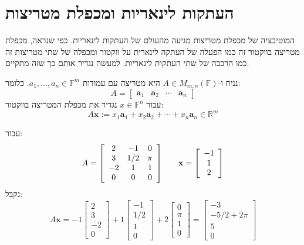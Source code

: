 \documentclass{tstextbook}
\begin{document}
\section{העתקות לינאריות ומכפלת מטריצות}

המוטיבציה של מכפלת מטריצות מגיעה מהעולם של העתקות לינאריות. כפי שנראה, מכפלת מטריצה בווקטור זה כמו הפעלה של העתקה לינארית על ווקטור ומכפלה של שתי מטריצות זה כמו הרכבה של שתי העתקות לינאריות. למעשה נגדיר אותם כך שזה מתקיים.

\begin{definition}
נניח ו-\(A\in M_{m,n}\left( \mathbb{F} \right)\) היא מטריצה עם עמודות \(a_{1},\dots,a_{n}\in \mathbb{F} ^{m}\). כלומר:
$$A=\begin{bmatrix}\mathbf{a}_{1}&\mathbf{a}_{2}&\cdots&\mathbf{a}_{n}\end{bmatrix}$$
עבור \(x \in \mathbb{F} ^{n}\) נגדיר את מכפלת המטריצה בווקטור:
$$A\mathbf{x}:=x_{1}\mathbf{a}_{1}+x_{2}\mathbf{a}_{2}+\cdots+x_{n}\mathbf{a}_{n}\in\mathbb{R}^{m}$$

\end{definition}
\begin{example}
עבור:
$$A={\left[\begin{array}{c c c}{2}&{-1}&{0}\\ {3}&{1/2}&{\pi}\\ {-2}&{1}&{1}\\ {0}&{0}&{0}\end{array}\right]}\quad\quad{\mathbf{x}}={\left[\begin{array}{c}{-1}\\ {1}\\ {2}\end{array}\right]}$$
נקבל:
$$A\mathbf{x}=-1\begin{bmatrix}2\\ 3\\ -2\\ 0\end{bmatrix}+1\begin{bmatrix}-1\\ 1/2\\ 1\\ 0\end{bmatrix}+2\begin{bmatrix}0\\ \pi\\ 1\\ 0\end{bmatrix}=\begin{bmatrix}-3\\ -5/2+2\pi\\ 5\\ 0\end{bmatrix}$$

\end{example}
\end{document}
